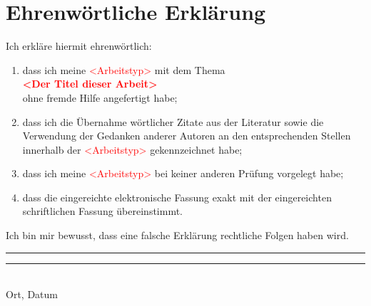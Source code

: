 \documentclass[fontsize=12pt,listof=totoc]{scrreprt}
\newcommand{\Titel}{\textcolor{red}{<Der Titel dieser Arbeit>}}
\newcommand{\Arbeitstyp}{\textcolor{red}{<Arbeitstyp>}}
\newcommand{\Textpath}{../text/text.tex}
\newif\ifglossary
\newif\ifroman
\begin{document}
	\iftotallstlistings
		\lstlistoflistings
	\fi
		
	\iftotaltables
		\listoftables
	\fi

	\ifroman
		\newpage
		\newcounter{lastroman}
		\setcounter{lastroman}{\value{page}}
		\pagenumbering{arabic}
	\fi
	\InputIfFileExists{\Textpath}{}
	
	\ifroman
		\newpage
		\pagenumbering{Roman}
		\setcounter{page}{\value{lastroman}}
	\fi
	\ifglossary
		\printglossaries
	\fi

	\printbibliography[heading=bibintoc]{}
		
	\newpage
	\hypertarget{decl}{}
	\chapter*{Ehrenwörtliche Erklärung}
		\thispagestyle{empty}
		Ich erkläre hiermit ehrenwörtlich:
		\renewcommand\labelenumi{\arabic{enumi})}
		\begin{enumerate}
			\item dass ich meine \Arbeitstyp{} mit dem Thema \\
				\textbf{\Titel} \\
				ohne fremde Hilfe angefertigt habe; 
			\item dass ich die Übernahme wörtlicher Zitate aus der Literatur sowie die Verwendung der Gedanken anderer Autoren an den entsprechenden Stellen innerhalb der \Arbeitstyp{} gekennzeichnet habe;
			\item dass ich meine \Arbeitstyp{} bei keiner anderen Prüfung vorgelegt habe;
			\item dass die eingereichte elektronische Fassung exakt mit der eingereichten schriftlichen Fassung übereinstimmt.\\
		\end{enumerate} 
		Ich bin mir bewusst, dass eine falsche Erklärung rechtliche Folgen haben wird.
		\vfill
		\noindent
		\rule[-7px]{120px}{.4pt}\hfill\rule[-7px]{120px}{.4pt}\\
		Ort, Datum\hfill{}
\end{document}
